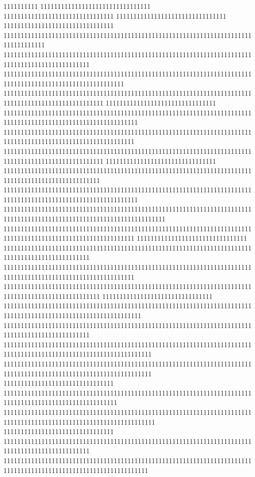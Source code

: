 1111111111
11111111111111111111111111111111
11111111111111111111111111111111
11111111111111111111111111111111
11111111111111111111111111111111
111111111111111111111111111111111111111111111111111111111111111111111111111111111111
1111111111111111111111111111111111111111111111111111111111111111111111111111111111111111111111111
11111111111111111111111111111111111111111111111111111111111111111111111111111111111111111111111111111111111
11111111111111111111111111111111111111111111111111111111111111111111111111111111111111111111111111111
11111111111111111111111111111111
111111111111111111111111111111111111111111111111111111111111111111111111111111111111111111111111111111111111111
11111111111111111111111111111111111111111111111111111111111111111111111111111111111111111111111111111111111111
11111111111111111111111111111111111111111111111111111111111111111111111111111111111111111111111111111
11111111111111111111111111111111
1111111111111111111111111111111111111111111111111111111111111111111111111111111111111111111111111111
111111111111111111111111111111111111111111111111111111111111111111111111111111111111111111111111111111111111111
11111111111111111111111111111111111111111111111111111111111111111111111111111111111111111111111111111111111111111111111
11111111111111111111111111111111111111111111111111111111111111111111111111111111111111111111111111111111111111
11111111111111111111111111111111
1111111111111111111111111111111111111111111111111111111111111111111111111111111111111111111111111
11111111111111111111111111111111111111111111111111111111111111111111111111111111111111111111111111111111111111
1111111111111111111111111111111111111111111111111111111111111111111111111111111111111111111111111111
11111111111111111111111111111111
1111111111111111111111111111111111111111111111111111111111111111111111111111111111111111111111111111111111111111
1111111111111111111111111111111111111111111111111111111111111111111111111111111111111111111111111
1111111111111111111111111111111111111111111111111111111111111111111111111111111111111111111111111111111111111111111
1111111111111111111111111111111111111111111111111111111111111111111111111111111111111111111111111111111111111111111
11111111111111111111111111111111
111111111111111111111111111111111111111111111111111111111111111111111111111111111111111111111111111111111
11111111111111111111111111111111111111111111111111111111111111111111111111111111111111111111111111111111111111111111
11111111111111111111111111111111
1111111111111111111111111111111111111111111111111111111111111111111111111111111111111111111111111
111111111111111111111111111111111111111111111111111111111111111111111111111111111111111111111111111111111111111111
